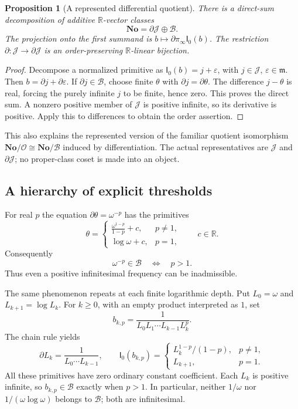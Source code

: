 \documentclass[11pt,a4paper]{article}
\newtheorem{proposition}[theorem]{Proposition}
\theoremstyle{definition}
\newcommand{\No}{\mathbf{No}}
\newcommand{\R}{\mathbb R}
\newcommand{\D}{\partial}
\newcommand{\OO}{\mathcal O}
\newcommand{\mm}{\mathfrak m}
\newcommand{\BB}{\mathcal B}
\newcommand{\JJ}{\mathcal J}
\newcommand{\Ip}{\mathsf I_0}
\newcommand{\pinf}{\pi_{\infty}}
\numberwithin{equation}{section}
\begin{document}
\begin{proposition}[A represented differential quotient]\label{prop:decompB}
There is a direct-sum decomposition of additive $\R$-vector classes
\begin{equation}\label{eq:Bsplit}
 \No=\D\JJ\oplus\BB.
\end{equation}
The projection onto the first summand is
$b\mapsto\D\pinf\Ip(b)$. The restriction
$\D:\JJ\to\D\JJ$ is an order-preserving $\R$-linear bijection.
\end{proposition}
\begin{proof}
Decompose a normalized primitive as
$\Ip(b)=j+\varepsilon$, with $j\in\JJ$, $\varepsilon\in\mm$.
Then $b=\D j+\D\varepsilon$. If $\D j\in\BB$, choose finite
$\theta$ with $\D j=\D\theta$. The difference $j-\theta$ is real,
forcing the purely infinite $j$ to be finite, hence zero. This proves the
direct sum. A nonzero positive member of $\JJ$ is positive infinite,
so its derivative is positive. Apply this to differences to obtain the
order assertion.
\end{proof}
This also explains the represented version of the familiar quotient
isomorphism $\No/\OO\cong\No/\BB$ induced by differentiation. The actual
representatives are $\JJ$ and $\D\JJ$; no proper-class coset is made into
an object.

\subsection{A hierarchy of explicit thresholds}
For real $p$ the equation $\D\theta=\omega^{-p}$ has the primitives
\begin{equation}\label{eq:powerprimitive}
 \theta=
 \begin{cases}
 \displaystyle\frac{\omega^{1-p}}{1-p}+c,&p\ne1,\\[5pt]
 \log\omega+c,&p=1,
 \end{cases}
 \qquad c\in\R.
\end{equation}
Consequently
\begin{equation}\label{eq:powerthreshold}
 \omega^{-p}\in\BB\quad\Longleftrightarrow\quad p>1.
\end{equation}
Thus even a positive infinitesimal frequency can be inadmissible.

The same phenomenon repeats at each finite logarithmic depth. Put
$L_0=\omega$ and $L_{k+1}=\log L_k$. For $k\ge0$, with an empty product
interpreted as $1$, set
\[
 b_{k,p}=\frac{1}{L_0L_1\cdots L_{k-1}L_k^p}.
\]
The chain rule yields
\[
 \D L_k=\frac1{L_0\cdots L_{k-1}},\qquad
 \Ip(b_{k,p})=
 \begin{cases}
 L_k^{1-p}/(1-p),&p\ne1,\\
 L_{k+1},&p=1.
 \end{cases}
\]
All these primitives have zero ordinary constant coefficient. Each $L_k$
is positive infinite, so $b_{k,p}\in\BB$ exactly when $p>1$.
In particular, neither $1/\omega$ nor
$1/(\omega\log\omega)$ belongs to $\BB$; both are infinitesimal.
\end{document}
